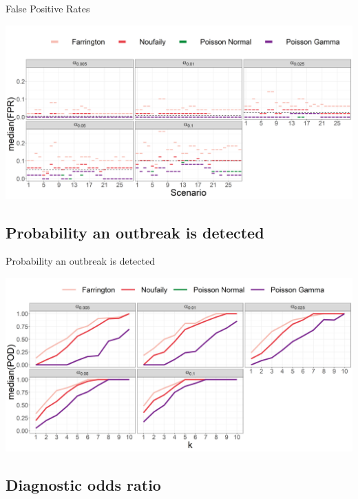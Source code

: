 \documentclass[aspectratio=169]{beamer}
\begin{document}
\begin{frame}{False Positive Rates}
\tiny

\includegraphics[width=1\linewidth]{../figures/FPR_alpha_methods_median}

\normalsize
\end{frame}

\hypertarget{probability-an-outbreak-is-detected}{%
\subsection{Probability an outbreak is
detected}\label{probability-an-outbreak-is-detected}}

\begin{frame}{Probability an outbreak is detected}
\tiny

\includegraphics[width=1\linewidth]{../figures/POD_alpha_methods_median}

\normalsize
\end{frame}

\hypertarget{diagnostic-odds-ratio}{%
\subsection{Diagnostic odds ratio}\label{diagnostic-odds-ratio}}
\end{document}
